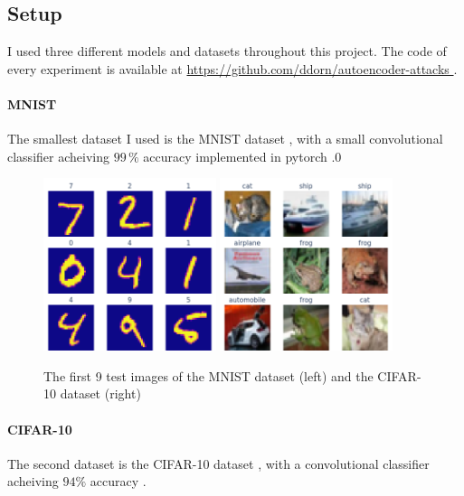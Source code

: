 \documentclass[]{scrarticle}
\begin{document}
\subsection{Setup}
I used three different models and datasets throughout this project.
The code of every experiment is available at \url{
  https://github.com/ddorn/autoencoder-attacks
}.

\paragraph{MNIST}
The smallest dataset I used is the MNIST dataset \cite{LeCun1998GradientbasedLA},
with a small convolutional classifier acheiving $99\,\%$ accuracy implemented in pytorch \cite{tuomaso2022trainmnistfast}.0

\begin{figure}[h]
  \centering
  \includegraphics[width=0.45\textwidth]{images/sample_MNIST.png}
  \includegraphics[width=0.45\textwidth]{images/sample_CIFAR10.png}
  \caption{The first 9 test images of the MNIST dataset (left) and the CIFAR-10 dataset (right)}
  \label{fig:mnist_cifar10_samples}
\end{figure}

\paragraph{CIFAR-10}
The second dataset is the CIFAR-10 dataset \cite{Krizhevsky2009LearningML},
with a convolutional classifier acheiving $94 \%$ accuracy \cite{999912022cifar10fastsimple}.
\end{document}
